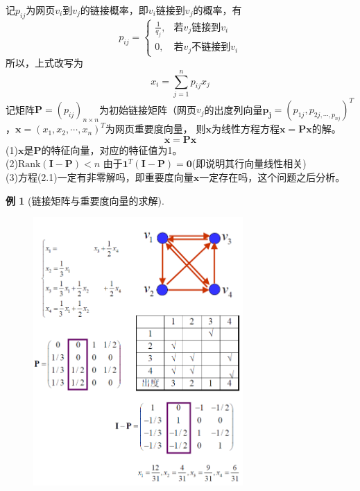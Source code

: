\documentclass[12pt, a4paper, oneside]{ctexbook}
\newtheorem{example}[theorem]{例}
\begin{document}
\noindent 记$p_{ij}$为网页$v_i$到$v_j$的链接概率，即$v_i$链接到$v_j$的概率，有
$$p_{ij}=\begin{cases}
\frac{1}{q_j},&\text{若}v_j\text{链接到}v_i\\
0,&\text{若}v_j\text{不链接到}v_i
\end{cases}$$
所以，上式改写为
$$x_i=\sum_{j=1}^np_{ij}x_j$$
记矩阵$\mathbf{P}=(p_{ij})_{n\times n}$为初始链接矩阵（网页$v_j$的出度列向量$\mathbf{p_j} = (p_{1j},p_{2j,\cdots,p_{nj}})^T$，$\mathbf{x}=(x_1,x_2,\cdots,x_n)^T$为网页重要度向量，
则$\mathbf{x}$为线性方程方程$\mathbf{x}=\mathbf{P}\mathbf{x}$的解。
\begin{equation}
    \mathbf{x}=\mathbf{P}\mathbf{x}
\end{equation}
\noindent(1)$\mathbf{x}$是$\mathbf{P}$的特征向量，对应的特征值为1。\\
(2)$\text{Rank}(\mathbf{I}-\mathbf{P})<n$ 由于$\mathbf{1}^T(\mathbf{I}-\mathbf{P}) = \mathbf{0}$(即说明其行向量线性相关)\\
(3)方程(2.1)一定有非零解吗，即重要度向量$\mathbf{x}$一定存在吗，这个问题之后分析。
\begin{example}[链接矩阵与重要度向量的求解]
    \begin{figure}[H]
        \centering
        \includegraphics[width=8cm]{assets/网页重要度例题.png}
    \end{figure}
\end{example}
\end{document}
